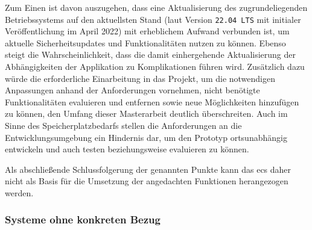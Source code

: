 \documentclass[a4paper,12pt,twoside,numbers=noendperiod]{scrreprt}
\begin{document}
Zum Einen ist davon auszugehen, dass eine Aktualisierung des zugrundeliegenden Betriebssystems auf den aktuellsten Stand (laut \cite{canonical_ltd_ubuntu_2023-1} Version \texttt{22.04 LTS} mit initialer Veröffentlichung im April 2022) mit erheblichem Aufwand verbunden ist, um aktuelle Sicherheitsupdates und Funktionalitäten nutzen zu können. Ebenso steigt die Wahrscheinlichkeit, dass die damit einhergehende Aktualisierung der Abhängigkeiten der Applikation zu Komplikationen führen wird. Zusätzlich dazu würde die erforderliche Einarbeitung in das Projekt, um die notwendigen Anpassungen anhand der Anforderungen vornehmen, nicht benötigte Funktionalitäten evaluieren und entfernen sowie neue Möglichkeiten hinzufügen zu können, den Umfang dieser Masterarbeit deutlich überschreiten. Auch im Sinne des Speicherplatzbedarfs stellen die Anforderungen an die Entwicklungsumgebung ein Hindernis dar, um den Prototyp ortsunabhängig entwickeln und auch testen beziehungsweise evaluieren zu können.

Als abschließende Schlussfolgerung der genannten Punkte kann das \ac{ecs} daher nicht als Basis für die Umsetzung der angedachten Funktionen herangezogen werden.

\subsubsection*{Systeme ohne konkreten Bezug}
\label{sub-sub-sec:technische-basis-systeme-ohne-bezug}
\end{document}
